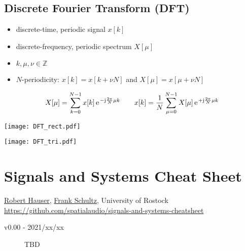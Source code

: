 \documentclass[landscape,columns=3]{cheatsheet} %
\begin{document}
\subsection{Discrete Fourier Transform (DFT)}
%
\begin{itemize}
\setlength\itemsep{-0.5em}
\item discrete-time, periodic signal $x[k]$
%
\item discrete-frequency, periodic spectrum $X[\mu]$
%
\item $k,\mu,\nu\in\mathbb{Z}$
%
\item  $N$-periodicity: $x[k]=x[k + \nu N]$ and $X[\mu]=x[\mu + \nu N]$
\end{itemize}
%
\begin{align*}
X[\mu] = \sum\limits_{k=0}^{N-1} x[k] \,\e^{-\im \frac{2\pi}{N} \mu k}
\qquad
x[k] = \frac{1}{N}\sum\limits_{\mu=0}^{N-1} X[\mu] \,\e^{+\im \frac{2\pi}{N} \mu k}
\end{align*}

\begin{minipage}{\columnwidth}
	\texttt{[image: DFT\_rect.pdf]}
\end{minipage}

\begin{minipage}{\columnwidth}
	\texttt{[image: DFT\_tri.pdf]}
\end{minipage}
\columnbreak

\section{Signals and Systems Cheat Sheet}
\href{https://github.com/robhau}{Robert Hauser},
\href{https://orcid.org/0000-0002-3010-0294}{Frank Schultz},
University of Rostock\\
\tiny
\url{https://github.com/spatialaudio/signals-and-systems-cheatsheet}
\normalsize
\begin{description}
\item[v0.00 - 2021/xx/xx] TBD
\end{description}
\nocite{sigsysex,Bronstein}


\end{document}
